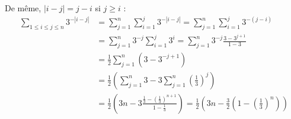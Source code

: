 {{De même, $|i-j|=j-i$ si $j\geq i$ :
\begin{align*}
 \boxed{\sum_{1\leq i\leq j\leq n} 3^{-|i-j|}} &= \sum_{j=1}^n \sum_{i=1}^j 3^{-|i-j|} = \sum_{j=1}^n \sum_{i=1}^j 3^{-(j-i)} \\
 &= \sum_{j=1}^n 3^{-j}\sum_{i=1}^j 3^i = \sum_{j=1}^n 3^{-j} \frac{3-3^{j+1}}{1-3} \\
 &= \frac12 \sum_{j=1}^n \left(3-3^{-j+1}\right)\\
 &= \frac12 \left( \sum_{j=1}^n 3 - 3\sum_{j=1}^n \left(\frac13\right)^j \right)\\
 &= \frac12 \left( 3n - 3\frac{\frac{1}{3}-\left(\frac13\right)^{n+1}}{1-\frac13} \right) = \boxed{\frac{1}{2}\left(3n-\frac{3}{2}\left(1-\left(\frac13\right)^n\right)\right)}
\end{align*}}
}

